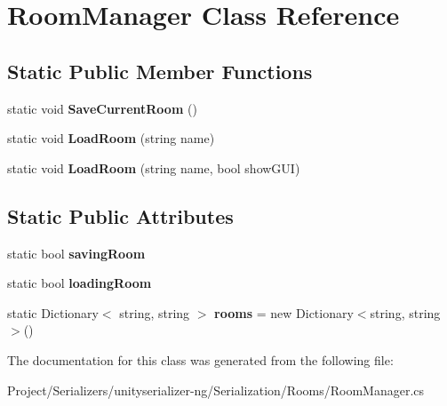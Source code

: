 \hypertarget{class_room_manager}{}\section{Room\+Manager Class Reference}
\label{class_room_manager}
\subsection*{Static Public Member Functions}
\begin{DoxyCompactItemize}
\item 
\mbox{\label{class_room_manager_aeb1c332336581a9f2f8347871a8b86ce}} 
static void {\bfseries Save\+Current\+Room} ()
\item 
\mbox{\label{class_room_manager_ae4dc2875ec849f36ad84b3b5fadb3b9e}} 
static void {\bfseries Load\+Room} (string name)
\item 
\mbox{\label{class_room_manager_a984b27dbc036e5c218a194bed0a96e79}} 
static void {\bfseries Load\+Room} (string name, bool show\+G\+UI)
\end{DoxyCompactItemize}
\subsection*{Static Public Attributes}
\begin{DoxyCompactItemize}
\item 
\mbox{\label{class_room_manager_aa1e3da11d5a2d3019e1d71da5d338614}} 
static bool {\bfseries saving\+Room}
\item 
\mbox{\label{class_room_manager_a7d1d76518301470913338347a00c5805}} 
static bool {\bfseries loading\+Room}
\item 
\mbox{\label{class_room_manager_a4932fea636739c5698e320bbe38beee6}} 
static Dictionary$<$ string, string $>$ {\bfseries rooms} = new Dictionary$<$string, string$>$()
\end{DoxyCompactItemize}


The documentation for this class was generated from the following file\+:\begin{DoxyCompactItemize}
\item 
Project/\+Serializers/unityserializer-\/ng/\+Serialization/\+Rooms/Room\+Manager.\+cs\end{DoxyCompactItemize}
